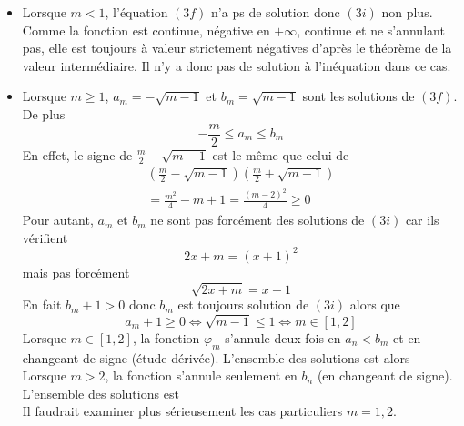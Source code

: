 \begin{itemize}
 \item Lorsque $m<1$, l'équation $(3f)$ n'a ps de solution donc $(3i)$ non plus. Comme la fonction est continue, négative en $+\infty$, continue et ne s'annulant pas, elle est toujours à valeur strictement négatives d'après le théorème de la valeur intermédiaire. Il n'y a donc pas de solution à l'inéquation dans ce cas. 
 \item Lorsque $m\geq1$, $a_m = -\sqrt{m-1}$ et $b_m = \sqrt{m-1}$ sont les solutions de $(3f)$.  De plus 
\begin{displaymath}
 -\frac{m}{2} \leq a_m \leq b_m
\end{displaymath}
En effet, le signe de $\frac{m}{2}-\sqrt{m-1}$ est le même que celui de
\begin{multline*}
\left(\frac{m}{2}-\sqrt{m-1} \right) \left(\frac{m}{2}+\sqrt{m-1} \right) \\
= \frac{m^2}{4}-m+1 =\frac{(m-2)^2}{4}\geq 0
\end{multline*}
Pour autant, $a_m$ et $b_m$ ne sont pas forcément des solutions de $(3i)$ car ils vérifient
\begin{displaymath}
  2x+m = (x+1)^2
\end{displaymath}
mais pas forcément
\begin{displaymath}
  \sqrt{2x+m} = x+1
\end{displaymath}
En fait $b_m + 1>0$ donc $b_m$ est toujours solution de $(3i)$ alors que 
\begin{displaymath}
  a_m + 1 \geq 0 \Leftrightarrow \sqrt{m-1}\leq 1 \Leftrightarrow m\in [1,2]
\end{displaymath}
Lorsque $m\in [1,2]$, la fonction $\varphi_m$ s'annule deux fois en $a_n<b_m$ et en changeant de signe (étude dérivée). L'ensemble des solutions est alors
\begin{displaymath}
  [-\sqrt{m-1},\sqrt{m-1}]
\end{displaymath}
Lorsque $m>2$, la fonction s'annule seulement en $b_n$ (en changeant de signe). L'ensemble des solutions est
\begin{displaymath}
  [-\frac{m}{2},\sqrt{m-1}]
\end{displaymath}
Il faudrait examiner plus sérieusement les cas particuliers $m=1,2$.
\end{itemize}

 

